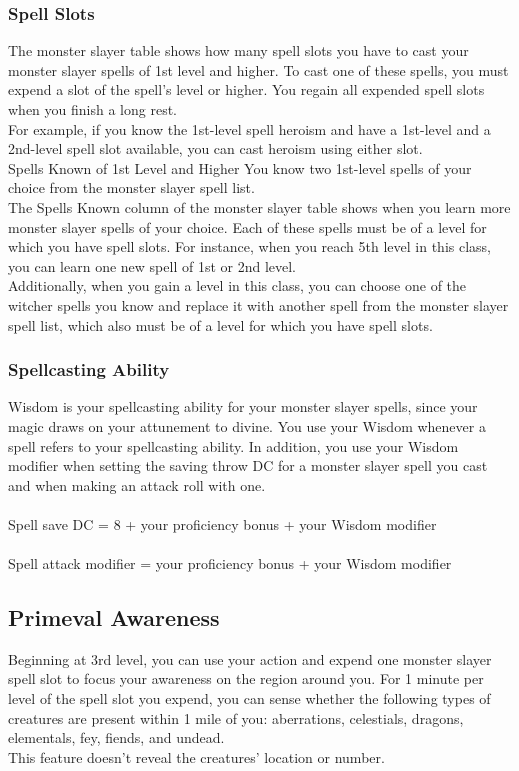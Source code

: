 \documentclass[11pt,a4paper,twocolumn]{article}
\begin{document}
	\subsubsection*{Spell Slots}
	The monster slayer table shows how many spell slots you have to cast your monster slayer spells of 1st level and higher. To cast one of these spells, you must expend a slot of the spell’s level or higher. You regain all expended spell slots when you finish a long rest. \\
	For example, if you know the 1st-level spell heroism and have a 1st-level and a
	2nd-level spell slot available, you can cast heroism using either slot. \\
	Spells Known of 1st Level and Higher You know two 1st-level spells of your choice
	from the monster slayer spell list. \\
	The Spells Known column of the monster slayer table shows when you learn more monster slayer spells of your choice. Each of these spells must be of a	level for which you have spell slots. For instance, when you reach 5th level in this class, you can learn one new spell of 1st or 2nd level. \\
	Additionally, when you gain a level in this class, you can choose one of the witcher spells you know and replace it with another spell from the monster slayer spell list, which also must be of a level for which you have spell slots.
	\subsubsection*{Spellcasting Ability}
	Wisdom is your spellcasting ability for your monster slayer spells, since your magic draws on your attunement to divine. You use your Wisdom whenever a spell refers to your spellcasting ability. In addition, you use your Wisdom modifier when setting the saving throw DC for a monster slayer spell you cast and when making an attack roll with one. \\
	\\
	Spell save DC = 8 + your proficiency bonus + your Wisdom modifier \\
	\\
	Spell attack modifier = your proficiency bonus + your Wisdom modifier \\
	
	\subsection*{Primeval Awareness}
	Beginning at 3rd level, you can use your action and expend one monster slayer spell slot to focus your awareness on the region around you. For 1 minute per level of the spell slot you expend, you can sense whether the following types of
	creatures are present within 1 mile of you: aberrations, celestials, dragons,
	elementals, fey, fiends, and undead. \\
	This feature doesn’t reveal the creatures’ location or number. 
	
\end{document}
